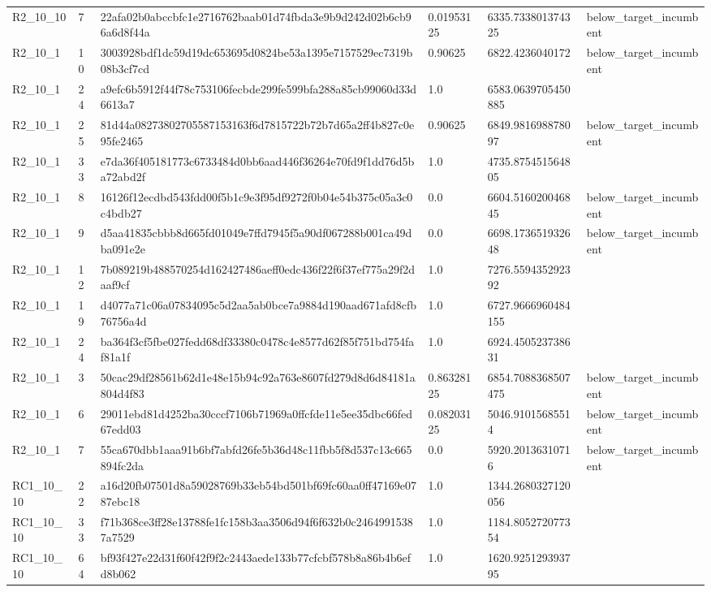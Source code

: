 \begin{tabular}{llllll}
 R2\_10\_10 & 7 & 22afa02b0abccbfc1e2716762baab01d74fbda3e9b9d242d02b6cb96a6d8f44a & 0.01953125 & 6335.733801374325 & below\_target\_incumbent \\
 R2\_10\_1 & 10 & 3003928bdf1dc59d19dc653695d0824be53a1395e7157529ec7319b08b3cf7cd & 0.90625 & 6822.4236040172 & below\_target\_incumbent \\
 R2\_10\_1 & 24 & a9efc6b5912f44f78c753106fecbde299fe599bfa288a85cb99060d33d6613a7 & 1.0 & 6583.0639705450885 &  \\
 R2\_10\_1 & 25 & 81d44a08273802705587153163f6d7815722b72b7d65a2ff4b827c0e95fe2465 & 0.90625 & 6849.981698878097 & below\_target\_incumbent \\
 R2\_10\_1 & 33 & e7da36f405181773c6733484d0bb6aad446f36264e70fd9f1dd76d5ba72abd2f & 1.0 & 4735.875451564805 &  \\
 R2\_10\_1 & 8 & 16126f12ecdbd543fdd00f5b1c9e3f95df9272f0b04e54b375c05a3c0c4bdb27 & 0.0 & 6604.516020046845 & below\_target\_incumbent \\
 R2\_10\_1 & 9 & d5aa41835cbbb8d665fd01049e7ffd7945f5a90df067288b001ca49dba091e2e & 0.0 & 6698.173651932648 & below\_target\_incumbent \\
 R2\_10\_1 & 12 & 7b089219b488570254d162427486aeff0edc436f22f6f37ef775a29f2daaf9cf & 1.0 & 7276.559435292392 &  \\
 R2\_10\_1 & 19 & d4077a71c06a07834095c5d2aa5ab0bce7a9884d190aad671afd8cfb76756a4d & 1.0 & 6727.9666960484155 &  \\
 R2\_10\_1 & 24 & ba364f3cf5fbe027fedd68df33380c0478c4e8577d62f85f751bd754faf81a1f & 1.0 & 6924.450523738631 &  \\
 R2\_10\_1 & 3 & 50cac29df28561b62d1e48e15b94c92a763e8607fd279d8d6d84181a804d4f83 & 0.86328125 & 6854.7088368507475 & below\_target\_incumbent \\
 R2\_10\_1 & 6 & 29011ebd81d4252ba30cccf7106b71969a0ffcfde11e5ee35dbc66fed67edd03 & 0.08203125 & 5046.91015685514 & below\_target\_incumbent \\
 R2\_10\_1 & 7 & 55ca670dbb1aaa91b6bf7abfd26fe5b36d48c11fbb5f8d537c13c665894fc2da & 0.0 & 5920.20136310716 & below\_target\_incumbent \\
 RC1\_10\_10 & 22 & a16d20fb07501d8a59028769b33eb54bd501bf69fc60aa0ff47169e0787ebc18 & 1.0 & 1344.2680327120056 &  \\
 RC1\_10\_10 & 33 & f71b368ce3ff28e13788fe1fc158b3aa3506d94f6f632b0c24649915387a7529 & 1.0 & 1184.805272077354 &  \\
 RC1\_10\_10 & 64 & bf93f427e22d31f60f42f9f2c2443aede133b77cfcbf578b8a86b4b6efd8b062 & 1.0 & 1620.925129393795 &  \\

\end{tabular}
